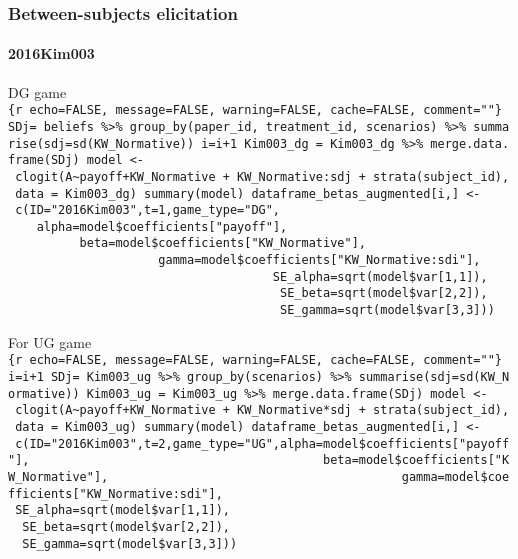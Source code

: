 \hypertarget{between-subjects-elicitation}{%
\subsubsection{Between-subjects
elicitation}\label{between-subjects-elicitation}}

\hypertarget{kim003-1}{%
\paragraph{2016Kim003}\label{kim003-1}}

DG game
\texttt{\{r\ echo=FALSE,\ message=FALSE,\ warning=FALSE,\ cache=FALSE,\ comment=""\}\ SDj=\ beliefs\ \%\textgreater{}\%\ group\_by(paper\_id,\ treatment\_id,\ scenarios)\ \%\textgreater{}\%\ summarise(sdj=sd(KW\_Normative))\ i=i+1\ Kim003\_dg\ =\ Kim003\_dg\ \%\textgreater{}\%\ merge.data.frame(SDj)\ model\ \textless{}-\ clogit(A\textasciitilde{}payoff+KW\_Normative\ +\ KW\_Normative:sdj\ +\ strata(subject\_id),\ data\ =\ Kim003\_dg)\ summary(model)\ dataframe\_betas\_augmented{[}i,{]}\ \textless{}-\ c(ID="2016Kim003",t=1,game\_type="DG",\ \ \ \ \ \ \ \ \ \ \ \ \ \ \ \ \ \ \ \ \ \ \ \ \ \ \ \ \ \ \ \ \ \ \ \ alpha=model\$coefficients{[}"payoff"{]},\ \ \ \ \ \ \ \ \ \ \ \ \ \ \ \ \ \ \ \ \ \ \ \ \ \ \ \ \ \ \ \ \ \ \ \ \ \ \ \ \ beta=model\$coefficients{[}"KW\_Normative"{]},\ \ \ \ \ \ \ \ \ \ \ \ \ \ \ \ \ \ \ \ \ \ \ \ \ \ \ \ \ \ \ \ \ \ \ \ \ \ \ \ \ gamma=model\$coefficients{[}"KW\_Normative:sdi"{]},\ \ \ \ \ \ \ \ \ \ \ \ \ \ \ \ \ \ \ \ \ \ \ \ \ \ \ \ \ \ \ \ \ \ \ \ \ \ \ \ \ SE\_alpha=sqrt(model\$var{[}1,1{]}),\ \ \ \ \ \ \ \ \ \ \ \ \ \ \ \ \ \ \ \ \ \ \ \ \ \ \ \ \ \ \ \ \ \ \ \ \ \ \ \ \ SE\_beta=sqrt(model\$var{[}2,2{]}),\ \ \ \ \ \ \ \ \ \ \ \ \ \ \ \ \ \ \ \ \ \ \ \ \ \ \ \ \ \ \ \ \ \ \ \ \ \ \ \ \ SE\_gamma=sqrt(model\$var{[}3,3{]}))}

For UG game
\texttt{\{r\ echo=FALSE,\ message=FALSE,\ warning=FALSE,\ cache=FALSE,\ comment=""\}\ i=i+1\ SDj=\ Kim003\_ug\ \%\textgreater{}\%\ group\_by(scenarios)\ \%\textgreater{}\%\ summarise(sdj=sd(KW\_Normative))\ Kim003\_ug\ =\ Kim003\_ug\ \%\textgreater{}\%\ merge.data.frame(SDj)\ model\ \textless{}-\ clogit(A\textasciitilde{}payoff+KW\_Normative\ +\ KW\_Normative*sdj\ +\ strata(subject\_id),\ data\ =\ Kim003\_ug)\ summary(model)\ dataframe\_betas\_augmented{[}i,{]}\ \textless{}-\ c(ID="2016Kim003",t=2,game\_type="UG",alpha=model\$coefficients{[}"payoff"{]},\ \ \ \ \ \ \ \ \ \ \ \ \ \ \ \ \ \ \ \ \ \ \ \ \ \ \ \ \ \ \ \ \ \ \ \ \ \ \ \ \ beta=model\$coefficients{[}"KW\_Normative"{]},\ \ \ \ \ \ \ \ \ \ \ \ \ \ \ \ \ \ \ \ \ \ \ \ \ \ \ \ \ \ \ \ \ \ \ \ \ \ \ \ \ gamma=model\$coefficients{[}"KW\_Normative:sdi"{]},\ \ \ \ \ \ \ \ \ \ \ \ \ \ \ \ \ \ \ \ \ \ \ \ \ \ \ \ \ \ \ \ \ \ \ \ \ \ \ \ \ SE\_alpha=sqrt(model\$var{[}1,1{]}),\ \ \ \ \ \ \ \ \ \ \ \ \ \ \ \ \ \ \ \ \ \ \ \ \ \ \ \ \ \ \ \ \ \ \ \ \ \ \ \ \ SE\_beta=sqrt(model\$var{[}2,2{]}),\ \ \ \ \ \ \ \ \ \ \ \ \ \ \ \ \ \ \ \ \ \ \ \ \ \ \ \ \ \ \ \ \ \ \ \ \ \ \ \ \ SE\_gamma=sqrt(model\$var{[}3,3{]}))}

